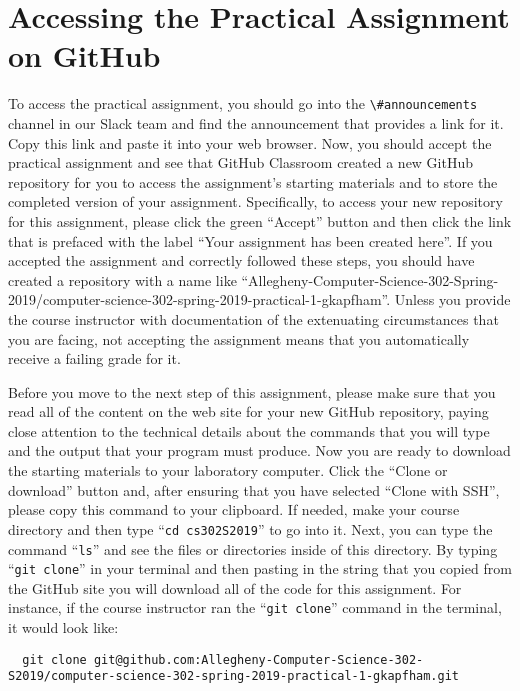 \documentclass[11pt]{article}
\newcommand{\command}[1]{``\lstinline{#1}''}
\newcommand{\channel}[1]{\lstinline{#1}} \newcommand{\option}[1]{``{#1}''}
\begin{document}
\section*{Accessing the Practical Assignment on GitHub}

To access the practical assignment, you should go into the
\channel{\#announcements} channel in our Slack team and find the announcement
that provides a link for it. Copy this link and paste it into your web browser.
Now, you should accept the practical assignment and see that GitHub Classroom
created a new GitHub repository for you to access the assignment's starting
materials and to store the completed version of your assignment. Specifically,
to access your new repository for this assignment, please click the green
``Accept'' button and then click the link that is prefaced with the label ``Your
assignment has been created here''. If you accepted the assignment and correctly
followed these steps, you should have created a repository with a name like
``Allegheny-Computer-Science-302-Spring-2019/computer-science-302-spring-2019-practical-1-gkapfham''.
Unless you provide the course instructor with documentation of the extenuating
circumstances that you are facing, not accepting the assignment means that you
automatically receive a failing grade for it.

Before you move to the next step of this assignment, please make sure that you
read all of the content on the web site for your new GitHub repository, paying
close attention to the technical details about the commands that you will type
and the output that your program must produce. Now you are ready to download the
starting materials to your laboratory computer. Click the ``Clone or download''
button and, after ensuring that you have selected ``Clone with SSH'', please
copy this command to your clipboard. If needed, make your course directory and
then type \command{cd cs302S2019} to go into it. Next, you can type the command
\command{ls} and see the files or directories inside of this directory. By
typing \command{git clone} in your terminal and then pasting in the string that
you copied from the GitHub site you will download all of the code for this
assignment. For instance, if the course instructor ran the \command{git clone}
command in the terminal, it would look like:

\begin{lstlisting}
  git clone git@github.com:Allegheny-Computer-Science-302-S2019/computer-science-302-spring-2019-practical-1-gkapfham.git
\end{lstlisting}
\end{document}
